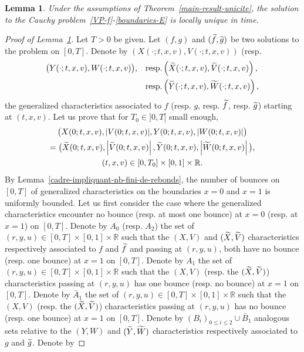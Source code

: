 \documentclass[10pt]{amsart}
\newtheorem{lemm}[theo]{Lemma}\newtheorem{prop}[theo]{Proposition}\newtheorem{coro}[theo]{Corollary}\newtheorem{conj}[theo]{Conjecture}
\theoremstyle{definition}\newtheorem{defi}[theo]{Definition}\newtheorem{rema}[theo]{Remark}\newtheorem{exam}[theo]{Example}\newtheorem{exem}[theo]{Example}\newtheorem{nota}[theo]{Notation}
\newcommand{\R}{\mathbb{R}}
\let\oldtilde\tilde
\renewcommand*{\tilde}[1]{\mathchoice{\widetilde{#1}}{\widetilde{#1}}{\oldtilde{#1}}{\oldtilde{#1}}}
\begin{document}
\begin{lemm}\label{dm-unicite}
Under the assumptions of Theorem~\ref{main-result-unicite}, the solution to the Cauchy problem~\eqref{VP-f}-\eqref{boundaries-E} is locally unique in time.
\end{lemm}
\begin{proof}[{Proof of Lemma~\ref{dm-unicite}}]
Let $T>0$ be given. Let $(f,g)$ and $(\tilde{f},\tilde{g})$ be two solutions to the problem on $[0,T]$. Denote by $(X(\cdot ; t,x,v),V(\cdot ; t,x,v))$ (resp.
\begin{align*}
\big(Y(\cdot ; t,x,v),W(\cdot ; t,x,v)\big), \quad &\text{resp.} \left(\tilde{X}(\cdot ; t,x,v),\tilde{V}(\cdot ; t,x,v)\right), \\ 
&\text{resp.} \left(\tilde{Y}(\cdot ; t,x,v),\tilde{W}(\cdot ; t,x,v)\right),
\end{align*}
the generalized characteristics associated to $f$ (resp. $g$, resp. $\tilde{f}$, resp. $\tilde{g}$) starting at $(t,x,v)$. Let us prove that for $T_0\in]0,T[$ small enough,
\begin{multline*}
\big(X(0;t,x,v),|V(0;t,x,v)|,Y(0;t,x,v),|W(0;t,x,v)|\big)\\
= \big(\tilde{X}(0;t,x,v),\left|\tilde{V}(0;t,x,v)\right|,\tilde{Y}(0;t,x,v),\left|\tilde{W}(0;t,x,v)\right|\big),\\
(t,x,v)\in [0,T_0] \times [0,1] \times \R.
\end{multline*}
By Lemma~\ref{cadre-impliquant-nb-fini-de-rebonds}, the number of bounces on $[0,T]$ of generalized characteristics on the boundaries $x=0$ and $x=1$ is uniformly bounded. Let us first consider the case where the generalized characteristics encounter no bounce (resp. at most one bounce) at $x=0$ (resp. at $x=1$) on $[0,T]$. Denote by $A_0$ (resp. $A_2$) the set of $(r,y,u)\in [0,T] \times [0,1] \times \R $ such that the $(X,V)$ and $(\tilde{X},\tilde{V})$ characteristics respectively associated to $f$ and $\tilde{f}$ and passing at $(r,y,u)$, both have no bounce (resp. one bounce) at $x= 1$ on $[0,T]$. Denote by $A_1$ the set of $(r,y,u)\in [0,T] \times [0,1] \times \R $ such that the $(X,V)$ (resp. the $(\tilde{X},\tilde{V})$) characteristics passing at $(r,y,u)$ has one bounce (resp. no bounce) at $x= 1$ on $[0,T]$. Denote by $\bar{A}_1$ the set of $(r,y,u)\in [0,T] \times [0,1] \times \R $ such that the $(X,V)$ (resp. the $(\tilde{X},\tilde{V})$) characteristics passing at $(r,y,u)$ has no bounce (resp. one bounce) at $x= 1$ on $[0,T]$. Denote by $(B_i)_{0\leq i\leq 2}\cup \bar{B}_1$ analogous sets relative to the $(Y,W)$ and $(\tilde{Y},\tilde{W})$ characteristics respectively associated to $g$ and $\tilde{g}$. Denote by

\end{proof}
\end{document}
